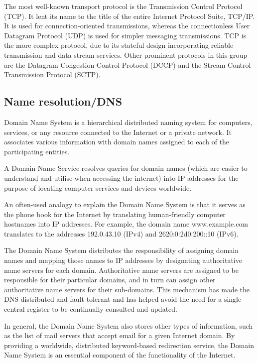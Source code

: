 \documentclass[a4paper,oneside]{report}
\begin{document}
	 The most well-known transport protocol is the Transmission Control Protocol (TCP). It lent its name to the title of the entire Internet Protocol Suite, TCP/IP. It is used for connection-oriented transmissions, whereas the connectionless User Datagram Protocol (UDP) is used for simpler messaging transmissions. TCP is the more complex protocol, due to its stateful design incorporating reliable transmission and data stream services. Other prominent protocols in this group are the Datagram Congestion Control Protocol (DCCP) and the Stream Control Transmission Protocol (SCTP).

    	\subsection{Name resolution/DNS}
	Domain Name System  is a hierarchical distributed naming system for computers, services, or any resource connected to the Internet or a private network. It associates various information with domain names assigned to each of the participating entities.

	  A Domain Name Service resolves queries for domain names (which are easier to understand and utilise when accessing the internet) into IP addresses for the purpose of locating computer services and devices worldwide.

	 An often-used analogy to explain the Domain Name System is that it serves as the phone book for the Internet by translating human-friendly computer hostnames into IP addresses. For example, the domain name www.example.com translates to the addresses 192.0.43.10 (IPv4) and 2620:0:2d0:200::10 (IPv6).
	
	The Domain Name System distributes the responsibility of assigning domain names and mapping those names to IP addresses by designating authoritative name servers for each domain. Authoritative name servers are assigned to be responsible for their particular domains, and in turn can assign other authoritative name servers for their sub-domains. This mechanism has made the DNS distributed and fault tolerant and has helped avoid the need for a single central register to be continually consulted and updated.

	 In general, the Domain Name System also stores other types of information, such as the list of mail servers that accept email for a given Internet domain. By providing a worldwide, distributed keyword-based redirection service, the Domain Name System is an essential component of the functionality of the Internet.
\end{document}
